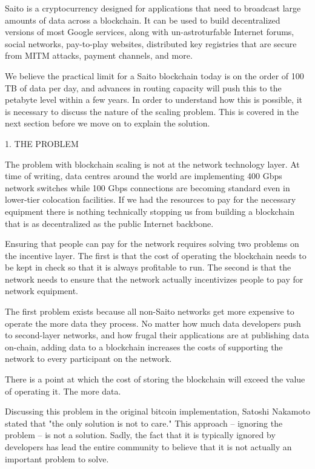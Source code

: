 \documentclass[11.5pt, oneside]{article}   	%
\begin{document}
\begin{multicols}{2}
Saito is a cryptocurrency designed for applications that need to broadcast large amounts of data across a blockchain. It can be used to build decentralized versions of most Google services, along with un-astroturfable Internet forums, social networks, pay-to-play websites, distributed key registries that are secure from MITM attacks, payment channels, and more.

We believe the practical limit for a Saito blockchain today is on the order of 100 TB of data per day, and advances in routing capacity will push this to the petabyte level within a few years. In order to understand how this is possible, it is necessary to discuss the nature of the scaling problem. This is covered in the next section before we move on to explain the solution.

1. THE PROBLEM

The problem with blockchain scaling is not at the network technology layer. At time of writing, data centres around the world are implementing 400 Gbps network switches while 100 Gbps connections are becoming standard even in lower-tier colocation facilities. If we had the resources to pay for the necessary equipment there is nothing technically stopping us from building a blockchain that is as decentralized as the public Internet backbone.

Ensuring that people can pay for the network requires solving two problems on the incentive layer. The first is that the cost of operating the blockchain needs to be kept in check so that it is always profitable to run. The second is that the network needs to ensure that the network actually incentivizes people to pay for network equipment.

The first problem exists because all non-Saito networks get more expensive to operate the more data they process. No matter how much data developers push to second-layer networks, and how frugal their applications are at publishing data on-chain, adding data to a blockchain increases the costs of supporting the network to every participant on the network. 

There is a point at which the cost of storing the blockchain will exceed the value of operating it. The more data.

Discussing this problem in the original bitcoin implementation, Satoshi Nakamoto stated that "the only solution is not to care."  This approach -- ignoring the problem -- is not a solution. Sadly, the fact that it is typically ignored by developers has lead the entire community to believe that it is not actually an important problem to solve. 


\end{multicols}
\end{document}
